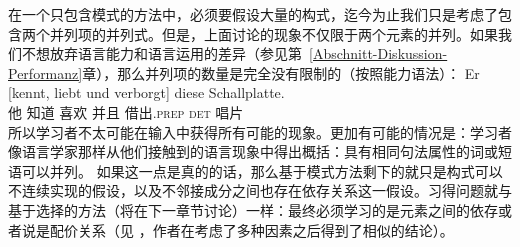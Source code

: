 \zl
在一个只包含模式的方法中，必须要假设大量的构式，迄今为止我们只是考虑了包含两个并列项的并列式。但是，上面讨论的现象不仅限于两个元素的并列。如果我们不想放弃语言能力和语言运用的差异（参见第~\ref{Abschnitt-Diskussion-Performanz}章），那么并列项的数量是完全没有限制的（按照能力语法）：
\ea
\gll Er [kennt, liebt und verborgt] diese Schallplatte.\\
	 他 \spacebr{}知道 喜欢 并且 借出.\textsc{prep} \textsc{det} 唱片\\
\z
所以学习者不太可能在输入中获得所有可能的现象。更加有可能的情况是：学习者像语言学家那样从他们接触到的语言现象中得出概括：具有相同句法属性的词或短语可以并列。
如果这一点是真的的话，那么基于模式方法剩下的就只是构式可以不连续实现的假设，以及不邻接成分之间也存在依存关系这一假设。习得问题就与基于选择的方法（将在下一章节讨论）一样：最终必须学习的是元素之间的依存或者说是配价关系（见 ，作者在考虑了多种因素之后得到了相似的结论）。%
\indexcxgend

